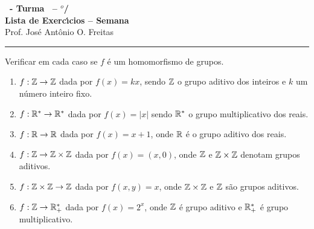 \documentclass[12pt]{exam}
\begin{document}
\begin{center}
    
    {\Large\bf \disciplina\ - Turma \turma\ -- \semestre$^{o}$/\ano} \\ \vspace{9pt} {\large\bf
        Lista de Exerc{\'\i}cios -- Semana \numerosemana}\\ \vspace{9pt} Prof. Jos{\'e} Ant{\^o}nio O. Freitas
    \end{center}
    \hrule

    \vspace{.6cm}
    
     Verificar em cada caso se $f$ \'e um homomorfismo de grupos.
    \begin{enumerate}[label=({\alph*})]
      \item $f: \mathbb{Z} \to \mathbb{Z}$ dada por $f(x) = kx$, sendo $\mathbb{Z}$ o grupo aditivo dos inteiros e $k$ um n\'umero inteiro fixo.
      
      \item $f: \mathbb{R}^* \to \mathbb{R}^*$ dada por $f(x) = |x|$ sendo $\mathbb{R}^*$ o grupo multiplicativo dos reais.
      
      \item $f: \mathbb{R} \to \mathbb{R}$ dada por $f(x) = x + 1$, onde $\mathbb{R}$ \'e o grupo aditivo dos reais.
      
      \item $f: \mathbb{Z} \to \mathbb{Z} \times \mathbb{Z}$ dada por $f(x) = (x, 0)$, onde $\mathbb{Z}$ e $\mathbb{Z} \times \mathbb{Z}$ denotam grupos aditivos.
      
      \item $f: \mathbb{Z} \times \mathbb{Z} \to \mathbb{Z}$ dada por $f(x,y) = x$, onde $\mathbb{Z} \times \mathbb{Z}$ e $\mathbb{Z}$ s\~ao grupos aditivos.
      
      \item $f: \mathbb{Z} \to \mathbb{R}^*_+$ dada por $f(x) = 2^x$, onde $\mathbb{Z}$ \'e grupo aditivo e $\mathbb{R}^*_+$ \'e grupo multiplicativo.
    \end{enumerate}

    \vspace{.3cm}
\end{document}
